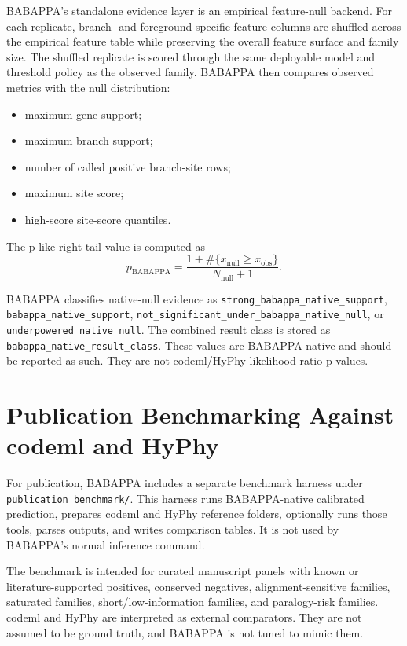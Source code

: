 \documentclass[11pt,a4paper]{article}
\begin{document}
BABAPPA's standalone evidence layer is an empirical feature-null backend. For each replicate, branch- and foreground-specific feature columns are shuffled across the empirical feature table while preserving the overall feature surface and family size. The shuffled replicate is scored through the same deployable model and threshold policy as the observed family. BABAPPA then compares observed metrics with the null distribution:

\begin{itemize}[leftmargin=*]
  \item maximum gene support;
  \item maximum branch support;
  \item number of called positive branch-site rows;
  \item maximum site score;
  \item high-score site-score quantiles.
\end{itemize}

The p-like right-tail value is computed as
\[
p_{\mathrm{BABAPPA}} = \frac{1 + \#\{x_{\mathrm{null}} \ge x_{\mathrm{obs}}\}}{N_{\mathrm{null}} + 1}.
\]

BABAPPA classifies native-null evidence as \texttt{strong\_babappa\_native\_support}, \texttt{babappa\_native\_support}, \texttt{not\_significant\_under\_babappa\_native\_null}, or \texttt{underpowered\_native\_null}. The combined result class is stored as \texttt{babappa\_native\_result\_class}. These values are BABAPPA-native and should be reported as such. They are not codeml/HyPhy likelihood-ratio p-values.

\section{Publication Benchmarking Against codeml and HyPhy}

For publication, BABAPPA includes a separate benchmark harness under \texttt{publication\_benchmark/}. This harness runs BABAPPA-native calibrated prediction, prepares codeml and HyPhy reference folders, optionally runs those tools, parses outputs, and writes comparison tables. It is not used by BABAPPA's normal inference command.

The benchmark is intended for curated manuscript panels with known or literature-supported positives, conserved negatives, alignment-sensitive families, saturated families, short/low-information families, and paralogy-risk families. codeml and HyPhy are interpreted as external comparators. They are not assumed to be ground truth, and BABAPPA is not tuned to mimic them.
\end{document}
